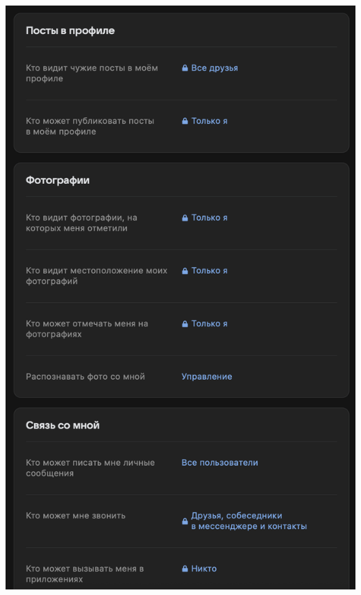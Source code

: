 \documentclass{article}
\begin{document}
\begin{center}
    \includegraphics[width=.9\textwidth]{7}
\end{center}
\end{document}
